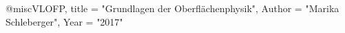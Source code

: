 \documentclass[a4paper,12pt,twoside]{article}
\begin{document}
@misc{VLOFP,
title = "Grundlagen der Oberflächenphysik",
Author = "Marika Schleberger",
Year = "2017"
}
\end{document}
